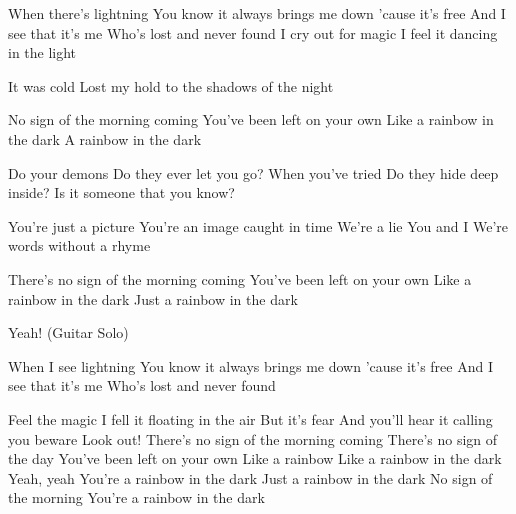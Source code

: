 

When there's lightning
You know it always brings me down
'cause it's free
And I see that it's me
Who's lost and never found
I cry out for magic
I feel it dancing in the light

It was cold
Lost my hold to the shadows of the night

No sign of the morning coming
You've been left on your own
Like a rainbow in the dark
A rainbow in the dark



Do your demons
Do they ever let you go?
When you've tried
Do they hide deep inside?
Is it someone that you know?

You're just a picture
You're an image caught in time
We're a lie
You and I
We're words without a rhyme




There's no sign of the morning coming
You've been left on your own
Like a rainbow in the dark
Just a rainbow in the dark

Yeah!
(Guitar Solo)

When I see lightning
You know it always brings me down
'cause it's free
And I see that it's me
Who's lost and never found

Feel the magic
I fell it floating in the air
But it's fear
And you'll hear it calling you beware
Look out!
There's no sign of the morning coming
There's no sign of the day
You've been left on your own
Like a rainbow
Like a rainbow in the dark
Yeah, yeah
You're a rainbow in the dark
Just a rainbow in the dark
No sign of the morning
You're a rainbow in the dark




